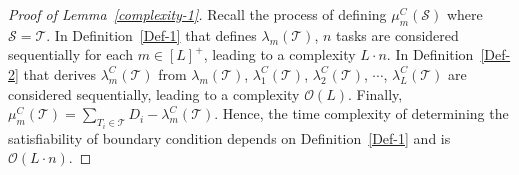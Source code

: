 \documentclass[10pt,journal,compsoc]{IEEEtran}
\begin{document}
\begin{proof}[Proof of Lemma~\ref{complexity-1}]
Recall the process of defining $\mu_{m}^{C}(\mathcal{S})$ where $\mathcal{S}=\mathcal{T}$. In Definition~\ref{Def-1} that defines $\lambda_{m}(\mathcal{T})$, $n$ tasks are considered sequentially for each $m\in [L]^{+}$, leading to a complexity $L\cdot n$. In Definition~\ref{Def-2} that derives $\lambda_{m}^{C}(\mathcal{T})$ from $\lambda_{m}(\mathcal{T})$, $\lambda_{1}^{C}(\mathcal{T})$, $\lambda_{2}^{C}(\mathcal{T})$, $\cdots$, $\lambda_{L}^{C}(\mathcal{T})$ are considered sequentially, leading to a complexity $\mathcal{O}(L)$. Finally, $\mu_{m}^{C}(\mathcal{T})=\sum_{T_{i}\in\mathcal{T}}{D_{i}} - \lambda_{m}^{C}(\mathcal{T})$. Hence, the time complexity of determining the satisfiability of boundary condition depends on Definition~\ref{Def-1} and is $\mathcal{O}(L\cdot n)$.
\end{proof}
\end{document}
